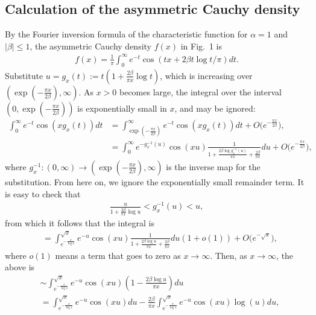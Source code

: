\documentclass[11pt]{article}
\theoremstyle{definition}
\begin{document}
\begin{appendix}

	\section{Calculation of the asymmetric Cauchy density}\label{appTailProbability}

	
	By the Fourier inversion formula of the characteristic function for $\alpha=1$ and $|\beta| \le 1$, the asymmetric Cauchy density $f(x)$ in Fig.~1 is
	\begin{align*}
	f(x) = \frac{1}{\pi} \int_0^\infty e^{-t} \cos(tx+2\beta t \log t/\pi) dt.
	\end{align*}
	Substitute $u = g_x(t) := t(1 + \frac{2\beta}{\pi x}\log t)$, which is increasing over $(\exp(-\frac{\pi x}{2\beta}),\infty)$. As $x>0$ becomes large, the integral over the interval $(0,\exp(-\frac{\pi x}{2\beta}))$ is exponentially small in $x$, and may be ignored:
	\begin{align*}
	\int_0^\infty e^{-t} \cos(x g_x(t)) dt &=  \int_{\exp(-\frac{\pi x}{2\beta})}^\infty  e^{-t} \cos(x g_x(t)) dt + O\big(e^{-\frac{\pi x}{2\beta}}\big), \\
	&= \int_{0}^\infty  e^{-g_x^{-1}(u)} \cos(x u) \frac{1}{1+\frac{2\beta\log g_x^{-1}(u)}{\pi x}+\frac{2\beta}{\pi x}} du + O\big(e^{-\frac{\pi x}{2\beta}}\big), 
	\end{align*}
	where $g_x^{-1} : (0,\infty) \to (\exp(-\frac{\pi x}{2\beta}),\infty)$ is the inverse map for the substitution. From here on, we ignore the exponentially small remainder term. It is easy to check that
	\begin{align*}
	\frac{u}{1+\frac{2\beta}{\pi x} \log u } < g^{-1}_x(u) < u,
	\end{align*}
	from which it follows that the integral is
	\begin{align*}
	&= \int_{e^{-\frac{x}{\log x}}}^{\sqrt{x}} e^{-u} \cos(x u) \frac{1}{1+\frac{2\beta\log u}{\pi x}+\frac{2\beta}{\pi x}} du (1+o(1)) + O\big(e^{-\sqrt{x}}\big), 
	\end{align*}
	where $o(1)$ means a term that goes to zero as $x \to \infty$. Then, as $x \to \infty$, the above is
	\begin{align}\label{eqMainTerm}
\nonumber	&\sim \int_{e^{-\frac{x}{\log x}}}^{\sqrt{x}} e^{-u} \cos(x u) \left( 1 - \frac{2\beta \log u}{\pi x} \right) du \\
	&= \int_{e^{-\frac{x}{\log x}}}^{\sqrt{x}} e^{-u} \cos(x u) du  - \frac{2\beta }{\pi x} \int_{e^{-\frac{x}{\log x}}}^{\sqrt{x}} e^{-u} \cos(x u) \log (u) du,

\end{align}
\end{appendix}
\end{document}
